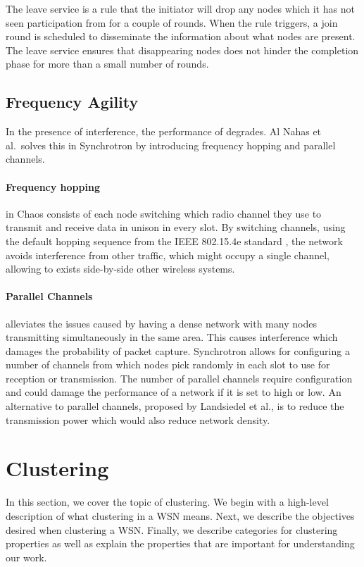 The leave service is a rule that the initiator will drop any nodes which it has not seen participation from for a couple of rounds. When the rule triggers, a join round is scheduled to disseminate the information about what nodes are present. The leave service ensures that disappearing nodes does not hinder the completion phase for more than a small number of rounds.

\subsection{Frequency Agility}
\label{subsec-frequency-agility}
In the presence of interference, the performance of \atwo{} degrades. Al Nahas et al.~solves this in Synchrotron by introducing frequency hopping and parallel channels.

\paragraph*{Frequency hopping} in Chaos consists of each node switching which radio channel they use to transmit and receive data in unison in every slot. By switching channels, using the default hopping sequence from the IEEE 802.15.4e standard \cite{IEEE-802-15-4}, the network avoids interference from other traffic, which might occupy a single channel, allowing \atwo{} to exists side-by-side other wireless systems. 

\paragraph*{Parallel Channels} alleviates the issues caused by having a dense network with many nodes transmitting simultaneously in the same area. This causes interference which damages the probability of packet capture. Synchrotron allows for configuring a number of channels from which nodes pick randomly in each slot to use for reception or transmission. The number of parallel channels require configuration and could damage the performance of a network if it is set to high or low. An alternative to parallel channels, proposed by Landsiedel et al., is to reduce the transmission power which would also reduce network density.


\section{Clustering}
\label{sec:background:clustering}

In this section, we cover the topic of clustering. We begin with a high-level description of what clustering in a WSN means. Next, we describe the objectives desired when clustering a WSN. Finally, we describe categories for clustering properties as well as explain the properties that are important for understanding our work.

